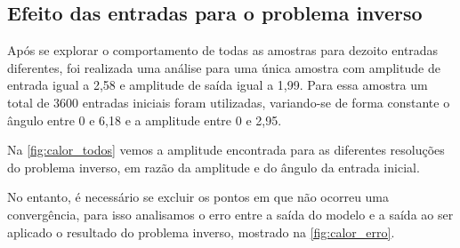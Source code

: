 \subsection{Efeito das entradas para o problema inverso} \label{subsec:estudoi-pi-entradas}
Após se explorar o comportamento de todas as amostras para dezoito entradas diferentes, foi realizada uma análise para uma única amostra com amplitude de entrada igual a 2,58 e amplitude de saída igual a 1,99. Para essa amostra um total de 3600 entradas iniciais foram utilizadas, variando-se de forma constante o ângulo entre 0 e 6,18 e a amplitude entre 0 e 2,95.

Na \autoref{fig:calor_todos} vemos a amplitude encontrada para as diferentes resoluções do problema inverso, em razão da amplitude e do ângulo da entrada inicial.

No entanto, é necessário se excluir os pontos em que não ocorreu uma convergência, para isso analisamos o erro entre a saída do modelo e a saída ao ser aplicado o resultado do problema inverso, mostrado na \autoref{fig:calor_erro}.

